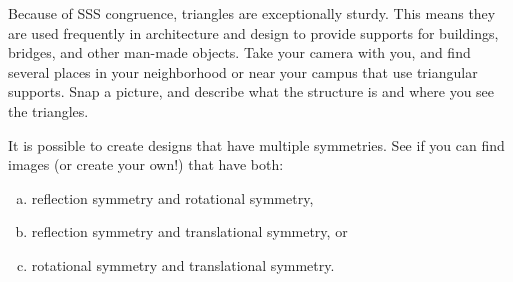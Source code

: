 \bigskip

\begin{problem}
Because of SSS congruence, triangles are exceptionally sturdy.  This means they are used frequently in architecture and design to provide supports for buildings, bridges, and other man-made objects.  Take your camera with you, and find several places in your neighborhood or near your campus that use triangular supports.  Snap a picture, and describe what the structure is and where you see the triangles.
\end{problem}



\bigskip

\begin{problem}
It is possible to create designs that have multiple symmetries.  See if you can find images (or create your own!) that have both:
\begin{enumerate}[(a)]
\item
reflection symmetry and rotational symmetry,\\
\item
reflection symmetry and translational symmetry, or\\
\item
rotational symmetry and translational symmetry.
\end{enumerate}

\end{problem}





